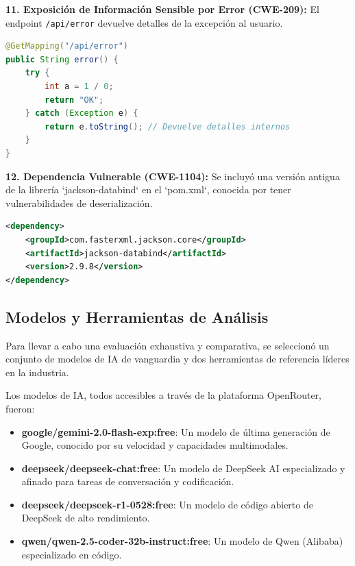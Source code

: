 \textbf{11. Exposición de Información Sensible por Error (CWE-209):} El endpoint \texttt{/api/error} devuelve detalles de la excepción al usuario.
\begin{lstlisting}[language=java, caption={Manejo de excepciones que expone información.}]
@GetMapping("/api/error")
public String error() {
    try {
        int a = 1 / 0;
        return "OK";
    } catch (Exception e) {
        return e.toString(); // Devuelve detalles internos
    }
}
\end{lstlisting}

\textbf{12. Dependencia Vulnerable (CWE-1104):} Se incluyó una versión antigua de la librería `jackson-databind` en el `pom.xml`, conocida por tener vulnerabilidades de deserialización.
\begin{lstlisting}[language=xml, caption={Dependencia vulnerable en pom.xml.}]
<dependency>
    <groupId>com.fasterxml.jackson.core</groupId>
    <artifactId>jackson-databind</artifactId>
    <version>2.9.8</version> 
</dependency>
\end{lstlisting}

\subsection{Modelos y Herramientas de Análisis}

Para llevar a cabo una evaluación exhaustiva y comparativa, se seleccionó un conjunto de modelos de IA de vanguardia y dos herramientas de referencia líderes en la industria.

Los modelos de IA, todos accesibles a través de la plataforma OpenRouter, fueron:
\begin{itemize}
    \item \textbf{google/gemini-2.0-flash-exp:free}: Un modelo de última generación de Google, conocido por su velocidad y capacidades multimodales.
    \item \textbf{deepseek/deepseek-chat:free}: Un modelo de DeepSeek AI especializado y afinado para tareas de conversación y codificación.
    \item \textbf{deepseek/deepseek-r1-0528:free}: Un modelo de código abierto de DeepSeek de alto rendimiento.
    \item \textbf{qwen/qwen-2.5-coder-32b-instruct:free}: Un modelo de Qwen (Alibaba) especializado en código.
\end{itemize}


